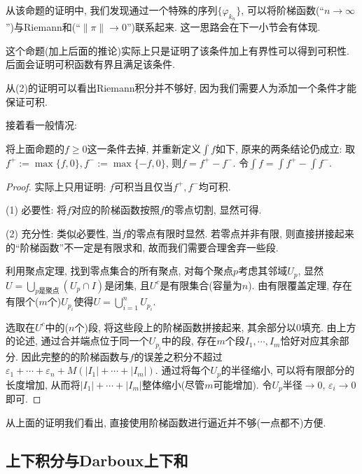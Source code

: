 \begin{remark}
	从该命题的证明中, 我们发现通过一个特殊的序列$\{ \varphi _{k_n} \}$, 可以将阶梯函数(“$n\to \infty$”)与Riemann和(“$\| \pi \|\to 0$”)联系起来. 这一思路会在下一小节会有体现. 
\end{remark}
\begin{remark}
	这个命题(加上后面的推论)实际上只是证明了该条件加上有界性可以得到可积性. 后面会证明可积函数有界且满足该条件. 
\end{remark}
\begin{remark}
	从(2)的证明可以看出Riemann积分并不够好, 因为我们需要人为添加一个条件才能保证可积. 
\end{remark}


接着看一般情况: 

\begin{corollary}{} \label{cor:fwfuhjuujiff}
	将上面命题的$f \geq 0$这一条件去掉, 并重新定义$\int f$如下, 原来的两条结论仍成立: 取$f^+ := \max \{ f,0 \}, f^{-} := \max \{ -f,0 \}$, 则$f=f^+-f^-$. 令$\int f = \int f^+ - \int f^-$. 
\end{corollary}
\begin{proof}
	实际上只用证明: $f$可积当且仅当$f^+,f^-$均可积. 
	
	(1) 必要性: 将$f$对应的阶梯函数按照$f$的零点切割, 显然可得. 
	
	(2) 充分性: 类似必要性, 当$f$的零点有限时显然. 若零点并非有限, 则直接拼接起来的“阶梯函数”不一定是有限求和, 故而我们需要合理舍弃一些段. 
	
	利用聚点定理, 找到零点集合的所有聚点, 对每个聚点$p$考虑其邻域$U_p$, 显然$U = \bigcup_{p\textit{是聚点}} (U_p \cap I) $是闭集, 且$U^c$是有限集合(容量为$n$). 由有限覆盖定理, 存在有限个($m$个)$U_{p_i}$使得$U=\bigcup_{i=1}^{n} U_{p_i}$. 
	
	选取在$U^c$中的($n$个)段, 将这些段上的阶梯函数拼接起来, 其余部分以$0$填充. 由上方的论述, 通过合并端点位于同一个$U_{p_i}$中的段, 存在$m$个段$I_1,\cdots ,I_m$恰好对应其余部分. 因此完整的的阶梯函数与$f$的误差之积分不超过$\varepsilon _1 + \cdots + \varepsilon _n + M(|I_1|+\cdots + |I_m|)$. 通过将每个$U_p$的半径缩小, 可以将有限部分的长度增加, 从而将$|I_1|+\cdots + |I_m|$整体缩小(尽管$m$可能增加). 令$U_p$半径$\to 0$, $\varepsilon _i \to 0$即可. 
\end{proof}
\begin{remark}
	从上面的证明我们看出, 直接使用阶梯函数进行逼近并不够(一点都不)方便. 
\end{remark}


\subsection{上下积分与Darboux上下和}

